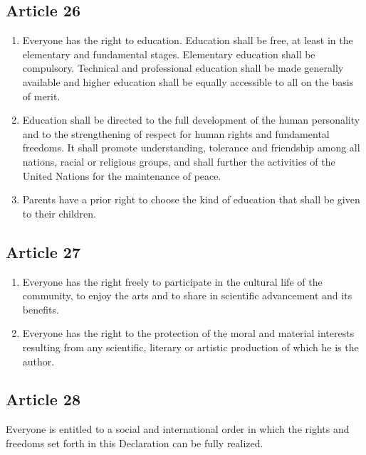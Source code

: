 \documentclass[
  ngerman,
  american,
  titlepage,
  openright,
  DIV=calc,
  toc=listof,
  listof=nochaptergap]{scrbook}
\begin{document}
\subsection{Article 26}\label{article-26}

\begin{enumerate}
\def\labelenumi{\arabic{enumi}.}
\item
  Everyone has the right to education. Education shall be free, at least
  in the elementary and fundamental stages. Elementary education shall
  be compulsory. Technical and professional education shall be made
  generally available and higher education shall be equally accessible
  to all on the basis of merit.
\item
  Education shall be directed to the full development of the human
  personality and to the strengthening of respect for human rights and
  fundamental freedoms. It shall promote understanding, tolerance and
  friendship among all nations, racial or religious groups, and shall
  further the activities of the United Nations for the maintenance of
  peace.
\item
  Parents have a prior right to choose the kind of education that shall
  be given to their children.
\end{enumerate}

\subsection{Article 27}\label{article-27}

\begin{enumerate}
\def\labelenumi{\arabic{enumi}.}
\item
  Everyone has the right freely to participate in the cultural life of
  the community, to enjoy the arts and to share in scientific
  advancement and its benefits.
\item
  Everyone has the right to the protection of the moral and material
  interests resulting from any scientific, literary or artistic
  production of which he is the author.
\end{enumerate}

\subsection{Article 28}\label{article-28}

Everyone is entitled to a social and international order in which the
rights and freedoms set forth in this Declaration can be fully realized.
\end{document}
